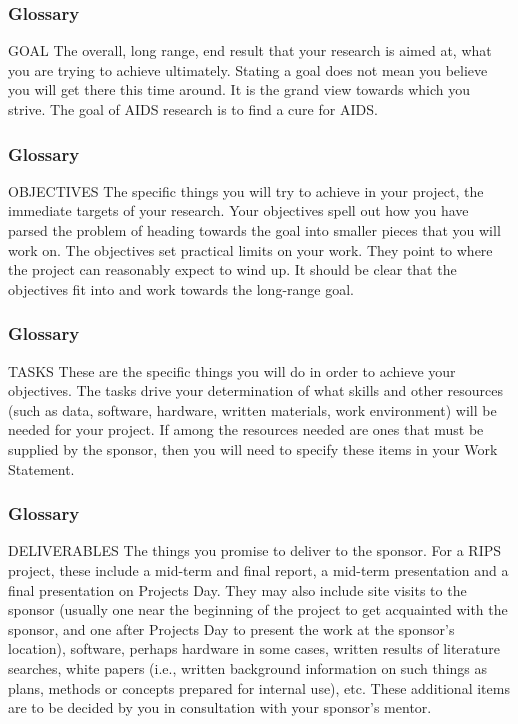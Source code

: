 \begin{frame}[allowframebreaks]
    \frametitle{Glossary}
    \begin{block}
        {GOAL} The overall, long range, end result that your research is aimed at, what
you are trying to achieve ultimately. Stating a goal does not mean you believe
you will get there this time around. It is the grand view towards which you
strive. The goal of AIDS research is to find a cure for AIDS.
\end{block}
\end{frame}

\begin{frame}
    \frametitle{Glossary}
    \begin{block}
        {OBJECTIVES} The specific things you will try to achieve in your project, the
immediate targets of your research. Your objectives spell out how you have
parsed the problem of heading towards the goal into smaller pieces that you
will work on. The objectives set practical limits on your work. They point to
where the project can reasonably expect to wind up. It should be clear that
the objectives fit into and work towards the long-range goal.
\end{block}
\end{frame}

\begin{frame}
    \frametitle{Glossary}
\begin{block}
        {TASKS} These are the specific things you will do in order to achieve your
objectives. The tasks drive your determination of what skills and other
resources (such as data, software, hardware, written materials, work
environment) will be needed for your project. If among the resources needed
are ones that must be supplied by the sponsor, then you will need to specify
these items in your Work Statement.
\end{block}
    
\end{frame}


\begin{frame}
    \frametitle{Glossary}
\begin{block}
        {DELIVERABLES} The things you promise to deliver to the sponsor. For a RIPS
project, these include a mid-term and final report, a mid-term presentation
and a final presentation on Projects Day. They may also include site visits to
the sponsor (usually one near the beginning of the project to get acquainted
with the sponsor, and one after Projects Day to present the work at the
sponsor's location), software, perhaps hardware in some cases, written results
of literature searches, white papers (i.e., written background information on
such things as plans, methods or concepts prepared for internal use), etc.
These additional items are to be decided by you in consultation with your
sponsor’s mentor.
\end{block}
    
\end{frame}

